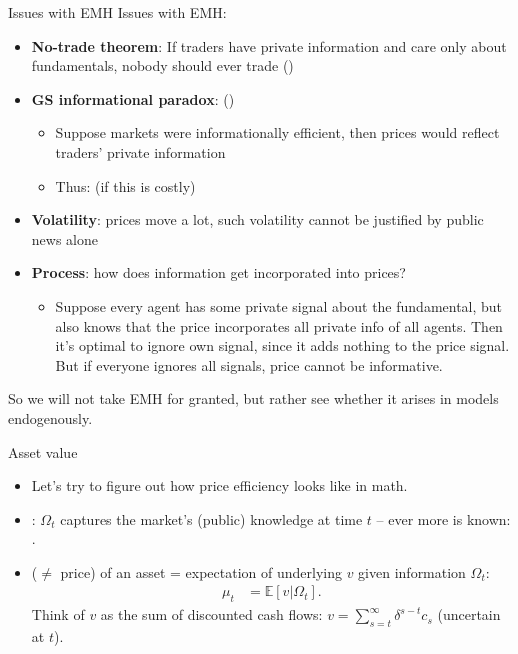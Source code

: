 \documentclass[english,10pt
,aspectratio=169
]{beamer}
\begin{document}
\begin{frame}{Issues with EMH}
Issues with EMH:
\begin{itemize}[<+->]
	\item \textbf{No-trade theorem}: If traders have private information and care only about fundamentals, nobody should ever trade (\cite{milgrom_information_1982})
	\item \textbf{GS informational paradox}: (\cite{grossman_impossibility_1980})
	\begin{itemize}
		\item Suppose markets were informationally efficient, then prices would reflect traders' private information
		\item Thus:  (if this is costly)
	\end{itemize} 
	\item \textbf{Volatility}: prices move a lot, such volatility cannot be justified by public news alone
	\item \textbf{Process}: \alert{how} does information get incorporated into prices?
	\begin{itemize}
		\item Suppose every agent has some private signal about the fundamental, but also knows that the price incorporates all private info of all agents. Then it's optimal to ignore own signal, since it adds nothing to the price signal. But if everyone ignores all signals, price cannot be informative.
	\end{itemize}
\end{itemize}
\pause[8]
So we will not take EMH for granted, but rather see whether it arises in models endogenously.
\end{frame}


\begin{frame}{Asset value}
	\begin{itemize}
		\item Let's try to figure out how price efficiency looks like in math.
		\item {}: $\Omega_t$ captures the market's (public) knowledge at time $t$ -- ever more is known: 
		. 
		
		\item {} ($\neq$ price) of an asset = expectation of underlying  $v$ given information $\Omega_{t}$:
		\begin{align*}
			\mu_t &= \mathbb{E} \left[ v | \Omega_t \right].
		\end{align*}
		Think of $v$ as the sum of discounted cash flows: $v = \sum_{s=t}^{\infty} \delta^{s-t} c_s$ (uncertain at $t$).
	\end{itemize}
\end{frame}
\end{document}
